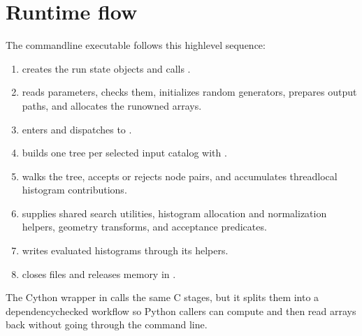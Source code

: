 \documentclass[letterpaper,10pt,english]{sphinxmanual}
\begin{document}
\section{Runtime flow}
\label{\detokenize{code_structure:runtime-flow}}
\sphinxAtStartPar
The command\sphinxhyphen{}line executable follows this high\sphinxhyphen{}level sequence:
\begin{enumerate}
%
\item {} 
\sphinxAtStartPar
{} creates the run state objects and calls .

\item {} 
\sphinxAtStartPar
{} reads parameters, checks them, initializes random
generators, prepares output paths, and allocates the run\sphinxhyphen{}owned arrays.

\item {} 
\sphinxAtStartPar
{} enters  and dispatches to .

\item {} 
\sphinxAtStartPar
{} builds one tree per selected input catalog with
.

\item {} 
\sphinxAtStartPar
{} walks the tree, accepts or rejects node pairs, and
accumulates thread\sphinxhyphen{}local histogram contributions.

\item {} 
\sphinxAtStartPar
{} supplies shared search utilities, histogram
allocation and normalization helpers, geometry transforms, and acceptance
predicates.

\item {} 
\sphinxAtStartPar
{} writes evaluated histograms through its 
helpers.

\item {} 
\sphinxAtStartPar
{} closes files and releases memory in .

\end{enumerate}

\sphinxAtStartPar
The Cython wrapper in  calls the same C stages, but it
splits them into a dependency\sphinxhyphen{}checked  workflow so Python
callers can compute and then read arrays back without going through the command
line.
\end{document}

